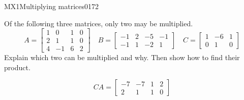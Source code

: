 \begin{exercise}{MX1}{Multiplying matrices}{0172} 
\begin{exerciseStatement} 

Of the following three matrices, only two may be multiplied. \[
          A=\left[\begin{array}{cccc}
1 & 0 & 1 & 0 \\
2 & 1 & 1 & 0 \\
4 & -1 & 6 & 2
\end{array}\right] \hspace{1em} B=\left[\begin{array}{cccc}
-1 & 2 & -5 & -1 \\
-1 & 1 & -2 & 1
\end{array}\right] \hspace{1em} C=\left[\begin{array}{ccc}
1 & -6 & 1 \\
0 & 1 & 0
\end{array}\right]
      \] Explain which two can be multiplied and why. Then show how to find their product.

 \end{exerciseStatement}
 \begin{exerciseAnswer} \[CA=\left[\begin{array}{cccc}
-7 & -7 & 1 & 2 \\
2 & 1 & 1 & 0
\end{array}\right]\] \end{exerciseAnswer}
 \end{exercise}



